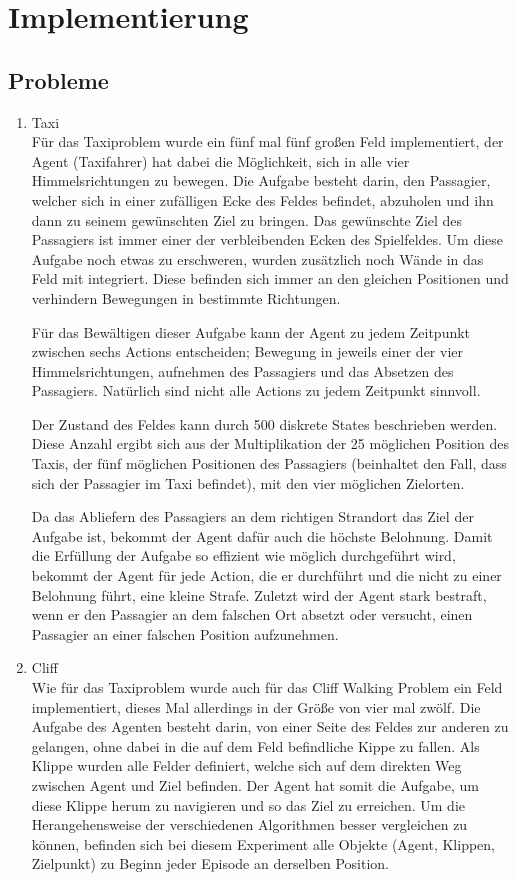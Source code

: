 \section{Implementierung}


\subsection{Probleme}

\begin{enumerate}
    \item Taxi\\
    Für das Taxiproblem wurde ein fünf mal fünf großen Feld implementiert, der Agent (Taxifahrer) hat dabei die Möglichkeit, sich in alle vier Himmelsrichtungen zu bewegen. Die Aufgabe besteht darin, den Passagier, welcher sich in einer zufälligen Ecke des Feldes befindet, abzuholen und ihn dann zu seinem gewünschten Ziel zu bringen. Das gewünschte Ziel des Passagiers ist immer einer der verbleibenden Ecken des Spielfeldes. Um diese Aufgabe noch etwas zu erschweren, wurden zusätzlich noch Wände in das Feld mit integriert. Diese befinden sich immer an den gleichen Positionen und verhindern Bewegungen in bestimmte Richtungen.

    Für das Bewältigen dieser Aufgabe kann der Agent zu jedem Zeitpunkt zwischen sechs Actions entscheiden; Bewegung in jeweils einer der vier Himmelsrichtungen, aufnehmen des Passagiers und das Absetzen des Passagiers. Natürlich sind nicht alle Actions zu jedem Zeitpunkt sinnvoll. 

    Der Zustand des Feldes kann durch 500 diskrete States beschrieben werden. Diese Anzahl ergibt sich aus der Multiplikation der 25 möglichen Position des Taxis, der fünf möglichen Positionen des Passagiers (beinhaltet den Fall, dass sich der Passagier im Taxi befindet), mit den vier möglichen Zielorten.

    Da das Abliefern des Passagiers an dem richtigen Strandort das Ziel der Aufgabe ist, bekommt der Agent dafür auch die höchste Belohnung. Damit die Erfüllung der Aufgabe so effizient wie möglich durchgeführt wird, bekommt der Agent für jede Action, die er durchführt und die nicht zu einer Belohnung führt, eine kleine Strafe. Zuletzt wird der Agent stark bestraft, wenn er den Passagier an dem falschen Ort absetzt oder versucht, einen Passagier an einer falschen Position aufzunehmen.
    \item Cliff\\
    Wie für das Taxiproblem wurde auch für das Cliff Walking Problem ein Feld implementiert, dieses Mal allerdings in der Größe von vier mal zwölf. Die Aufgabe des Agenten besteht darin, von einer Seite des Feldes zur anderen zu gelangen, ohne dabei in die auf dem Feld befindliche Kippe zu fallen. Als Klippe wurden alle Felder definiert, welche sich auf dem direkten Weg zwischen Agent und Ziel befinden. Der Agent hat somit die Aufgabe, um diese Klippe herum zu navigieren und so das Ziel zu erreichen. Um die Herangehensweise der verschiedenen Algorithmen besser vergleichen zu können, befinden sich bei diesem Experiment alle Objekte (Agent, Klippen, Zielpunkt) zu Beginn jeder Episode an derselben Position.


\end{enumerate}
